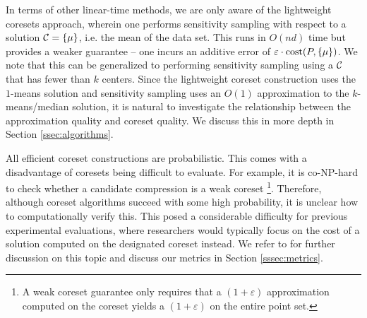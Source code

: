 In terms of other linear-time methods, we are only aware of the lightweight coresets approach\cite{BachemL018}, wherein one performs sensitivity
sampling with respect to a solution $\mathcal C=\{\mu\}$, i.e. the mean of the data set. This runs in $O(nd)$ time but provides a weaker guarantee -- one incurs an
additive error of $\varepsilon\cdot \operatorname{cost}(P,\{\mu\})$.  We note that this can be generalized to performing sensitivity sampling using a $\mathcal C$ that has fewer
than $k$ centers. Since the lightweight coreset construction uses the $1$-means solution and sensitivity sampling uses an $O(1)$ approximation to the
$k$-means/median solution, it is natural to investigate the relationship between the approximation quality and coreset quality. We discuss this in more depth in
Section \ref{ssec:algorithms}.

All efficient coreset constructions are probabilistic. This comes with a disadvantage of coresets being difficult to evaluate. For example, it is
co-NP-hard to check whether a candidate compression is a weak coreset \cite{chrisESA} \footnote{A weak coreset guarantee only requires that a $(1+\varepsilon)$
approximation computed on the coreset yields a $(1+\varepsilon)$ on the entire point set.}. Therefore, although coreset algorithms succeed with some high
probability, it is unclear how to computationally verify this.  This posed a considerable difficulty for previous experimental evaluations,
where researchers would typically focus on the cost of a solution computed on the designated coreset instead. We refer to \cite{chrisESA} for further discussion
on this topic and discuss our metrics in Section \ref{sssec:metrics}.
